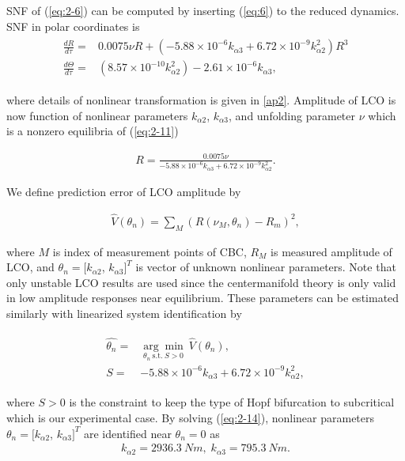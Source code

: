 \documentclass[openacc]{rsproca_new}%
\newcommand{\Eref}[1]{(\ref{#1})}
\begin{document}
SNF of \Eref{eq:2-6} can be computed by inserting \Eref{eq:6} to the reduced dynamics. SNF in polar coordinates is
\begin{align}\label{eq:2-11}
\begin{split}
\frac{dR}{d\tau}=&0.0075\nu R+(- 5.88 \times 10^{-6}  k_{\alpha 3} + 6.72 \times 10^{-9} k_{\alpha 2}^2)R^3\\
\frac{d\Theta}{d\tau}=&(8.57 \times 10^{-10}  k_{\alpha 2}^2) - 2.61 \times 10^{-6}k_{\alpha 3},
\end{split}
\end{align}

\noindent where details of nonlinear transformation is given in \ref{ap2}. Amplitude of LCO is now function of nonlinear parameters $k_{\alpha2}$, $k_{\alpha3}$, and unfolding parameter $\nu$ which is a nonzero equilibria of \Eref{eq:2-11}

\begin{align}\label{eq:2-12}
R=\frac{0.0075\nu}{- 5.88 \times 10^{-6}  k_{\alpha 3} + 6.72 \times 10^{-9} k_{\alpha 2}^2}.
\end{align}

\noindent We define prediction error of LCO amplitude by

\begin{align}\label{eq:2-13}
\hat{V}(\theta_n)=\sum_M (R(\nu_M,\theta_n)-R_m)^2,
\end{align}

\noindent where $M$ is index of measurement points of CBC, $R_M$ is measured amplitude of LCO, and $\theta_n=[k_{\alpha2}$, $k_{\alpha3}]^T$ is vector of unknown nonlinear parameters. Note that only unstable LCO results are used since the centermanifold theory is only valid in low amplitude responses near equilibrium. These parameters can be estimated similarly with linearized system identification by

\begin{align}\label{eq:2-14}
\begin{split}
\hat{\theta_n}=&\underset{\theta_n \: \textrm{s.t.} \: S>0} {\arg\min} \: \hat V(\theta_n),\\
S=&- 5.88 \times 10^{-6}  k_{\alpha 3} + 6.72 \times 10^{-9} k_{\alpha 2}^2,
\end{split}
\end{align}

\noindent where $S>0$ is the constraint to keep the type of Hopf bifurcation to subcritical which is our experimental case. By solving \Eref{eq:2-14}, nonlinear parameters $\theta_n=[k_{\alpha2}$, $k_{\alpha3}]^T$ are identified near $\theta_n=0$ as
\begin{align}\label{eq:2-15}
k_{\alpha2}=2936.3 \: Nm, \; k_{\alpha3}=795.3 \: Nm.
\end{align}
\end{document}
